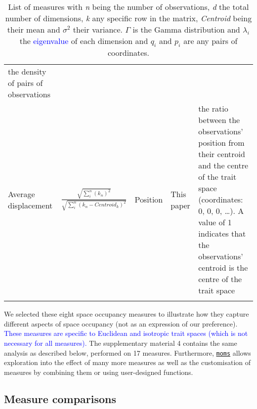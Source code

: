 \documentclass[]{article}
\begin{document}
\begin{longtable}[]{@{}lllll@{}}
\begin{minipage}[t]{0.11\columnwidth}
the density of pairs of observations\strut
\end{minipage}\tabularnewline
\begin{minipage}[t]{0.12333\columnwidth}\raggedright\strut
Average displacement\strut
\end{minipage} & \begin{minipage}[t]{0.23333\columnwidth}\raggedright\strut
\(\frac{\sqrt{\sum_{i}^{n}{({k}_{n})^2}}}{\sqrt{\sum_{i}^{n}{({k}_{n}-Centroid_{k})^2}}}\)\strut
\end{minipage} & \begin{minipage}[t]{0.08333\columnwidth}\raggedright\strut
Position\strut
\end{minipage} & \begin{minipage}[t]{0.11\columnwidth}\raggedright\strut
This paper\strut
\end{minipage} & \begin{minipage}[t]{0.26\columnwidth}\raggedright\strut
the ratio between the observations' position from their centroid and the
centre of the trait space (coordinates: 0, 0, 0, \ldots{}). A value of 1
indicates that the observations' centroid is the centre of the trait
space\strut
\end{minipage}\tabularnewline
\bottomrule
\caption{List of measures with \emph{n} being the number of
observations, \emph{d} the total number of dimensions, \emph{k} any
specific row in the matrix, \emph{Centroid} being their mean and
\(\sigma^{2}\) their variance. \(\Gamma\) is the Gamma distribution and
\(\lambda_{i}\) the \textcolor{blue}{eigenvalue} of each
dimension and \({q}_{i}\) and \(p_{i}\) are any pairs of coordinates.}
\end{longtable}

\renewcommand\baselinestretch{1.6}\selectfont

We selected these eight space occupancy measures to illustrate how they
capture different aspects of space occupancy (not as an expression of
our preference).
\textcolor{blue}{These measures are specific to Euclidean and isotropic trait spaces (which is not necessary for all measures).}
The supplementary material 4 contains the same analysis as described
below, performed on 17 measures. Furthermore,
\href{https://tguillerme.shinyapps.io/moms/}{\texttt{moms}} allows
exploration into the effect of many more measures as well as the
customisation of measures by combining them or using user-designed
functions.

\subsection{Measure comparisons}\label{measure-comparisons}
\end{document}
